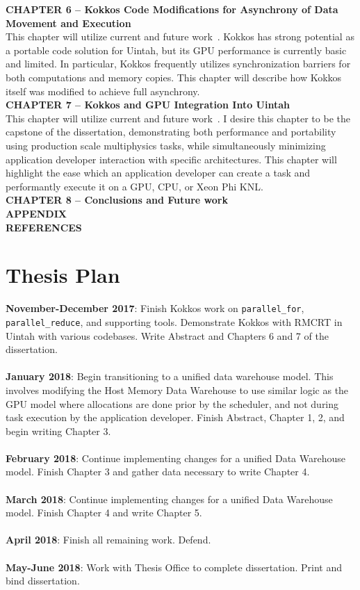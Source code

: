 \documentclass[12pt]{article}
\begin{document}
\textbf{CHAPTER 6 – Kokkos Code Modifications for Asynchrony of Data Movement and Execution}\\
This chapter will utilize current and future work~\cite{espm2-16,jocs18}.  Kokkos has strong potential as a portable code solution for Uintah, but its GPU performance is currently basic and limited.  In particular, Kokkos frequently utilizes synchronization barriers for both computations and memory copies.  This chapter will describe how Kokkos itself was modified to achieve full asynchrony.\\
\textbf{CHAPTER 7 – Kokkos and GPU Integration Into Uintah}\\
This chapter will utilize current and future work~\cite{espm2-16,jocs18}.  I desire this chapter to be the capstone of the dissertation, demonstrating both performance and portability using production scale multiphysics tasks, while simultaneously minimizing application developer interaction with specific architectures.  This chapter will highlight the ease which an application developer can create a task and performantly execute it on a GPU, CPU, or Xeon Phi KNL.  \\  
\textbf{CHAPTER 8 – Conclusions and Future work}\\
\textbf{APPENDIX}\\
\textbf{REFERENCES}\\

\section{Thesis Plan}
\label{ch:thesis_plan}

\textbf{November-December 2017}: Finish Kokkos work on \texttt{parallel\_for}, \texttt{parallel\_reduce}, and supporting tools.  Demonstrate Kokkos with RMCRT in Uintah with various codebases.  Write Abstract and Chapters 6 and 7 of the dissertation.\\
\\
\textbf{January 2018}: Begin transitioning to a unified data warehouse model.  This involves modifying the Host Memory Data Warehouse to use similar logic as the GPU model where allocations are done prior by the scheduler, and not during task execution by the application developer.  Finish Abstract, Chapter 1, 2, and begin writing Chapter 3.\\
\\
\textbf{February 2018}: Continue implementing changes for a unified Data Warehouse model.  Finish Chapter 3 and gather data necessary to write Chapter 4.\\
\\
\textbf{March 2018}: Continue implementing changes for a unified Data Warehouse model.  Finish Chapter 4 and write Chapter 5.  \\
\\
\textbf{April 2018}: Finish all remaining work.   Defend. \\
\\
\textbf{May-June 2018}: Work with Thesis Office to complete dissertation.  Print and bind dissertation. \\
\end{document}
